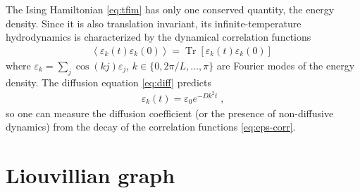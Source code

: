 \documentclass[aps,prb,nofootinbib,twocolumn,balancelastpage,amsmath,amssymb,floatfix,superscriptaddress,]{revtex4-1}
\newcommand{\tr}{\operatorname{Tr}}
\newcommand{\expct}[1]{\left\langle #1 \right\rangle}
\begin{document}
The Ising Hamiltonian \eqref{eq:tfim} has only one conserved quantity, the energy density.
Since it is also translation invariant,
its infinite-temperature hydrodynamics is characterized by the dynamical correlation functions
\begin{align}
  \label{eq:eps-corr}
  \expct{\varepsilon_k(t) \varepsilon_k(0)} = \tr [\varepsilon_k(t) \varepsilon_k(0)]\;
\end{align}
where $\varepsilon_k = \sum_j \cos( k j) \varepsilon_j$, $k \in \{0, 2\pi/ L, \dots, \pi\}$ are Fourier modes of the energy density.
The diffusion equation \eqref{eq:diff} predicts
\begin{align}
  \varepsilon_k(t) = \varepsilon_0 e^{-Dk^2t}\;,
\end{align}
so one can measure the diffusion coefficient (or the presence of non-diffusive dynamics)
from the decay of the correlation functions \eqref{eq:eps-corr}.




\section{Liouvillian graph}\label{s:op-graph}
\end{document}
